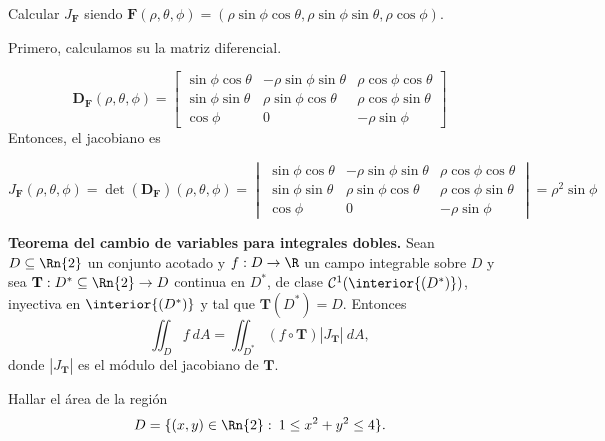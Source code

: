    \begin{example}  Calcular $J_\mathbf{F}$   siendo  \( \mathbf{F}(\rho, \theta, \phi)  = (\rho\sin\phi\cos\theta, \rho\sin\phi\sin\theta, \rho\cos\phi) \). 
   
   
    Primero, calculamos su la matriz diferencial.
   
    \[
    \boldsymbol{D}_{\mathbf{F}}(\rho, \theta, \phi) 
    =
    \begin{bmatrix}
    \sin\phi \cos\theta & -\rho \sin\phi \sin\theta & \rho \cos\phi \cos\theta \\
    \sin\phi \sin\theta & \rho \sin\phi \cos\theta & \rho \cos\phi \sin\theta \\
    \cos\phi & 0 & -\rho \sin\phi
    \end{bmatrix}
    \]
     Entonces, el jacobiano es 
    
    \[
    J_\mathbf{F}(\rho, \theta, \phi)  = \det(\boldsymbol{D}_{\mathbf{F}})(\rho, \theta, \phi)  = \begin{vmatrix}
        \sin\phi \cos\theta & -\rho \sin\phi \sin\theta & \rho \cos\phi \cos\theta \\
        \sin\phi \sin\theta & \rho \sin\phi \cos\theta & \rho \cos\phi \sin\theta \\
        \cos\phi & 0 & -\rho \sin\phi
        \end{vmatrix}=\rho^2 \sin\phi
    \]
    
    
    \end{example}

\begin{theorem} %
    \textbf{Teorema del cambio de variables para integrales dobles.}   Sean $D \subseteq\Rn{2}$ un conjunto acotado y  $f:D \to\R$ un campo integrable sobre $D$   y sea $\mathbf{T}:D^*\subseteq\Rn{2}\to D$ continua en $D^*$,  de clase $\mathcal{C}^1(\interior{(D^*)})$,  inyectiva en $\interior{(D^*)}$ y tal que $\mathbf{T}(D^*)=D$. Entonces
    \[
        \iint_D f\:dA=\iint_{D^*}(f\circ\mathbf{T})|J_\mathbf{T}|\:dA,
    \]
    donde $|J_\mathbf{T}|$ es el m\'odulo del jacobiano de $\mathbf{T}$.
\end{theorem}


 \begin{example} Hallar el \'area de la regi\'on $$ D=\{(x,y)\in\Rn{2}: \: 1 \leq x^{2}+ y^{2}  \leq4 \}.$$ 
 \end{example} 
